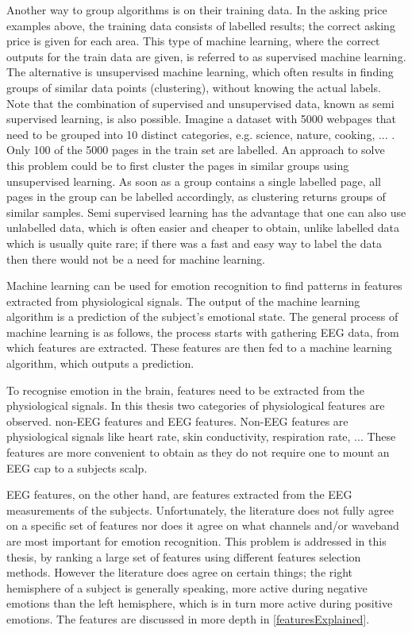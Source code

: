Another way to group algorithms is on their training data. In the asking price examples above, the training data consists of labelled results; the correct asking price is given for each area. This type of machine learning, where the correct outputs for the train data are given, is referred to as supervised machine learning. The alternative is unsupervised machine learning, which often results in finding groups of similar data points (clustering), without knowing the actual labels. Note that the combination of supervised and unsupervised data, known as semi supervised learning, is also possible. Imagine a dataset with 5000 webpages that need to be grouped into 10 distinct categories, e.g. science, nature, cooking, ... . Only 100 of the 5000 pages in the train set are labelled. An approach to solve this problem could be to first cluster the pages in similar groups using unsupervised learning. As soon as a group contains a single labelled page, all pages in the group can be labelled accordingly, as clustering returns groups of similar samples. Semi supervised learning has the advantage that one can also use unlabelled data, which is often easier and cheaper to obtain, unlike labelled data which is usually quite rare; if there was a fast and easy way to label the data then there would not be a need for machine learning.

\npar

Machine learning can be used for emotion recognition to find patterns in features extracted from physiological signals. The output of the machine learning algorithm is a prediction of the subject's emotional state. The general process of machine learning is as follows, the process starts with gathering EEG data, from which features are extracted. These features are then fed to a machine learning algorithm, which outputs a prediction.

\npar

To recognise emotion in the brain, features need to be extracted from the physiological signals. In this thesis two categories of physiological features are observed. non-EEG features and EEG features. Non-EEG features are physiological signals like heart rate, skin conductivity, respiration rate, ... These features are more convenient to obtain as they do not require one to mount an EEG cap to a subjects scalp. 

\npar

EEG features, on the other hand, are features extracted from the EEG measurements of the subjects. Unfortunately, the literature does not fully agree on a specific set of features nor does it agree on what channels and/or waveband are most important for emotion recognition. This problem is addressed in this thesis, by ranking a large set of features using different features selection methods. However the literature does agree on certain things; the right hemisphere of a subject is generally speaking, more active during negative emotions than the left hemisphere, which is in turn more active during positive emotions\cite{RealTimeEEGEmotion,EEGDatasets,killyPaper}. The features are discussed in more depth in \ref{featuresExplained}.

